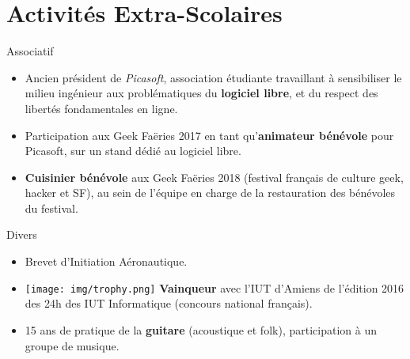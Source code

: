 \documentclass[a4paper]{twentysecondcv} %
\begin{document}
\section{Activités Extra-Scolaires}
\begin{twenty}
    \twentyitem
    	{}
		{}
        {Associatif}
        {}
        {}
        {\begin{itemize}
        \item Ancien président de \textit{Picasoft}, association étudiante travaillant à sensibiliser le milieu ingénieur aux problématiques du \textbf{logiciel libre}, et du respect des libertés fondamentales en ligne.
        \item Participation aux Geek Faëries 2017 en tant qu'\textbf{animateur bénévole} pour Picasoft, sur un stand dédié au logiciel libre.
        \item \textbf{Cuisinier bénévole} aux Geek Faëries 2018 (festival français de culture geek, hacker et SF), au sein de l'équipe en charge de la restauration des bénévoles du festival.
        \end{itemize}}
    \twentyitem
        {}
                {}
        {Divers}
        {}
        {}
        {\begin{itemize}
        \item Brevet d'Initiation Aéronautique.
        \item \texttt{[image: img/trophy.png]} \textbf{Vainqueur} avec l'IUT d'Amiens de l'édition 2016 des 24h des IUT Informatique (concours national français).
        \item 15 ans de pratique de la \textbf{guitare} (acoustique et folk), participation à un groupe de musique.
        \end{itemize}}
\end{twenty}
\end{document}
